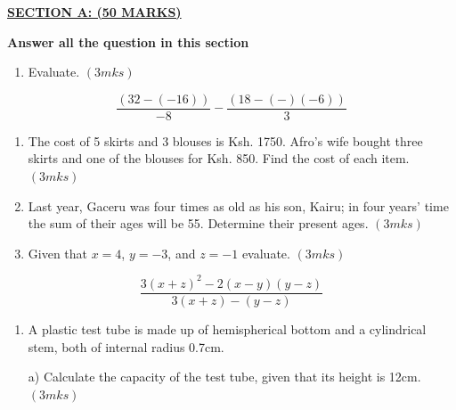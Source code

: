 \documentclass[
  a4paperpaper,
]{scrbook}
\providecommand{\tightlist}{%
  \setlength{\itemsep}{0pt}\setlength{\parskip}{0pt}}\usepackage{longtable,booktabs,array}
\begin{document}
\begin{tcolorbox}[enhanced jigsaw, left=2mm, colframe=quarto-callout-note-color-frame, toptitle=1mm, opacitybacktitle=0.6, rightrule=.15mm, colbacktitle=quarto-callout-note-color!10!white, colback=white, arc=.35mm, breakable, leftrule=.75mm, bottomtitle=1mm, bottomrule=.15mm, title=\textcolor{quarto-callout-note-color}{\faInfo}\hspace{0.5em}{Model Sample Paper 5}, titlerule=0mm, coltitle=black, toprule=.15mm, opacityback=0]

\ul{\textbf{SECTION A: (50 MARKS)}}

\textbf{Answer all the question in this section}

\begin{enumerate}
\def\labelenumi{\arabic{enumi}.}
\tightlist
\item
  Evaluate. \((3mks)\)
\end{enumerate}

\[\frac{\left(32-(-16)\right)}{-8}-\frac{\left(18-(-)(-6)\right)}{3}\]

\begin{enumerate}
\def\labelenumi{\arabic{enumi}.}
\setcounter{enumi}{1}
\item
  The cost of 5 skirts and 3 blouses is Ksh. 1750. Afro's wife bought
  three skirts and one of the blouses for Ksh. 850. Find the cost of
  each item. \((3mks)\)
\item
  Last year, Gaceru was four times as old as his son, Kairu; in four
  years' time the sum of their ages will be 55. Determine their present
  ages. \((3mks)\)
\item
  Given that \(x=4\), \(y= -3\), and \(z= -1\) evaluate. \((3mks)\)
\end{enumerate}

\[\frac{3(x+z)^2-2(x-y)(y-z)}{3(x+z)-(y-z)}\]

\begin{enumerate}
\def\labelenumi{\arabic{enumi}.}
\setcounter{enumi}{4}
\item
  A plastic test tube is made up of hemispherical bottom and a
  cylindrical stem, both of internal radius 0.7cm.

  a) Calculate the capacity of the test tube, given that its height is
  12cm. \((3mks)\)


\end{enumerate}
\end{tcolorbox}
\end{document}
